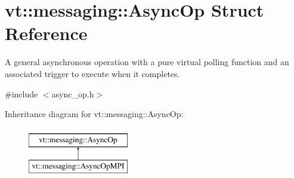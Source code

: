 \hypertarget{structvt_1_1messaging_1_1_async_op}{}\section{vt\+:\+:messaging\+:\+:Async\+Op Struct Reference}
\label{structvt_1_1messaging_1_1_async_op}


A general asynchronous operation with a pure virtual polling function and an associated trigger to execute when it completes.  




{\ttfamily \#include $<$async\+\_\+op.\+h$>$}

Inheritance diagram for vt\+:\+:messaging\+:\+:Async\+Op\+:\begin{figure}[H]
\begin{center}
\leavevmode
\includegraphics[height=2.000000cm]{structvt_1_1messaging_1_1_async_op}
\end{center}
\end{figure}
